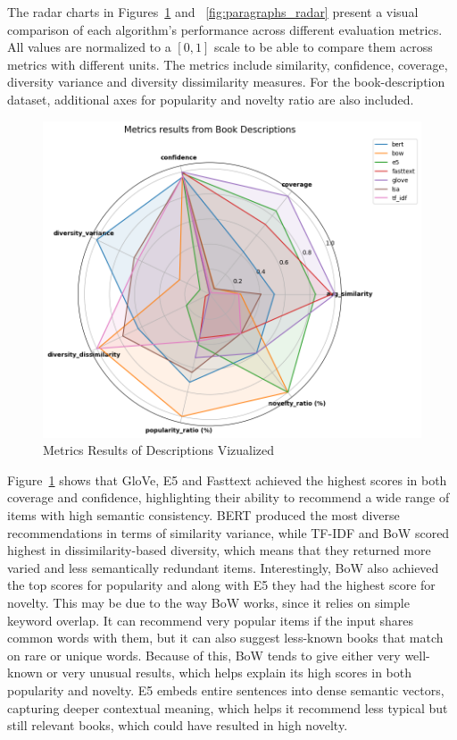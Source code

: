 \documentclass[\myFontSize,a4paper,oneside,hidelinks]{article}
\begin{document}
The radar charts in Figures~\ref{fig:descriptions_radar} and ~\ref{fig:paragraphs_radar} present a visual comparison of each algorithm’s performance across different evaluation metrics. All values are normalized to a \([0, 1]\) scale to be able to compare them across metrics with different units. The metrics include similarity, confidence, coverage, diversity variance and diversity dissimilarity measures. For the book-description dataset, additional axes for popularity and novelty ratio are also included.
%
%
\begin{figure}[h!]
    \centering
    \includegraphics[width=\linewidth,keepaspectratio]{img/descriptions_metrics_radar2.png}
    \caption{Metrics Results of Descriptions Vizualized}
    \label{fig:descriptions_radar}
\end{figure}
%
Figure~\ref{fig:descriptions_radar} shows that GloVe, E5 and Fasttext achieved the highest scores in both coverage and confidence, highlighting their ability to recommend a wide range of items with high semantic consistency. BERT produced the most diverse recommendations in terms of similarity variance, while TF-IDF and BoW scored highest in dissimilarity-based diversity, which means that they returned more varied and less semantically redundant items. Interestingly, BoW also achieved the top scores for popularity and along with E5 they had the highest score for novelty. This may be due to the way BoW works, since it relies on simple keyword overlap. It can recommend very popular items if the input shares common words with them, but it can also suggest less-known books that match on rare or unique words. Because of this, BoW tends to give either very well-known or very unusual results, which helps explain its high scores in both popularity and novelty. E5 embeds entire sentences into dense semantic vectors, capturing deeper contextual meaning, which helps it recommend less typical but still relevant books, which could have resulted in high novelty.
\end{document}
